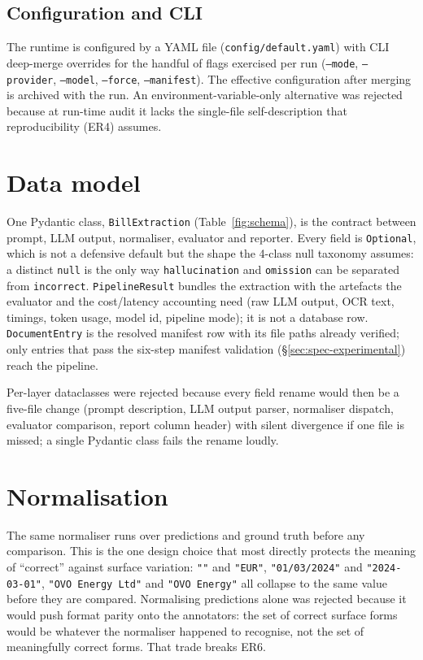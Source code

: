 \subsection{Configuration and CLI}

The runtime is configured by a YAML file (\texttt{config/default.yaml}) with CLI deep-merge overrides
for the handful of flags exercised per run (\texttt{--mode},
\texttt{--provider}, \texttt{--model}, \texttt{--force},
\texttt{--manifest}). The effective configuration after merging is
archived with the run. An environment-variable-only alternative was
rejected because at run-time audit it lacks the single-file
self-description that reproducibility (ER4) assumes.

\section{Data model}
\label{sec:design-datamodel}

One Pydantic class, \texttt{BillExtraction}
(Table~\ref{fig:schema}), is the contract between prompt, LLM
output, normaliser, evaluator and reporter. Every field is
\texttt{Optional}, which is not a defensive default but the shape
the 4-class null taxonomy assumes: a distinct \texttt{null} is the
only way \texttt{hallucination} and \texttt{omission} can be
separated from \texttt{incorrect}. \texttt{PipelineResult} bundles
the extraction with the artefacts the evaluator and the
cost/latency accounting need (raw LLM output, OCR text, timings,
token usage, model id, pipeline mode); it is not a database row.
\texttt{DocumentEntry} is the resolved manifest row with its file
paths already verified; only entries that pass the six-step manifest
validation (\S\ref{sec:spec-experimental}) reach the pipeline.

Per-layer dataclasses were rejected because every field rename
would then be a five-file change (prompt description, LLM output
parser, normaliser dispatch, evaluator comparison, report column
header) with silent divergence if one file is missed; a single
Pydantic class fails the rename loudly.

\section{Normalisation}
\label{sec:design-normalisation}

The same normaliser runs over predictions and ground truth before
any comparison. This is the one design choice that most directly
protects the meaning of ``correct'' against surface variation:
\texttt{"\texteuro"} and \texttt{"EUR"}, \texttt{"01/03/2024"} and
\texttt{"2024-03-01"}, \texttt{"OVO Energy Ltd"} and \texttt{"OVO
Energy"} all collapse to the same value before they are compared.
Normalising predictions alone was rejected because it would push
format parity onto the annotators: the set of correct surface forms
would be whatever the normaliser happened to recognise, not the set
of meaningfully correct forms. That trade breaks ER6.

